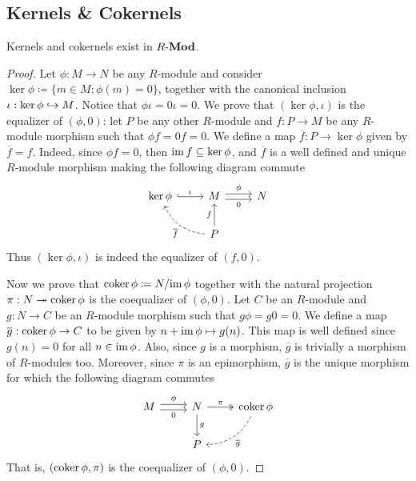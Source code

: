 \subsection{Kernels \& Cokernels}

\begin{lemma}
\label{lem:ker-coker-exist-in-R-mod}
Kernels and cokernels exist in \({R\text{-}\textbf{Mod}}\).
\end{lemma}

\begin{proof}
Let \(\phi: M \to N\) be any \(R\)-module and consider
\(\ker \phi \coloneq \{m \in M \colon \phi(m) = 0\}\), together with the
canonical inclusion \(\iota: \ker \phi \hookrightarrow M\). Notice that
\(\phi \iota = 0 \iota = 0\). We prove that \((\ker \phi, \iota)\) is the
equalizer of \((\phi, 0)\): let \(P\) be any other \(R\)-module and
\(f: P \to M\) be any \(R\)-module morphism such that \(\phi f = 0 f = 0\). We
define a map \(\overline{f}: P \to \ker \phi\) given by \(\overline{f} = f\).
Indeed, since \(\phi f = 0\), then \(\operatorname{im} f \subseteq \ker \phi\), and
\(\overline{f}\) is a well defined and unique \(R\)-module morphism making the
following diagram commute
\[
\begin{tikzcd}
\ker \phi \ar[r, hook, "\iota"]
&M \ar[r, shift left, "\phi"] \ar[r, shift right, "0"']
&N \\
&P \ar[u, "f"] \ar[ul, dashed, bend left, "\overline{f}"] &
\end{tikzcd}
\]
Thus \((\ker \phi, \iota)\) is indeed the equalizer of \((f, 0)\).

Now we prove that \(\operatorname{coker} \phi \coloneq N/{\operatorname{im} \phi}\) together with the
natural projection \(\pi: N \twoheadrightarrow \operatorname{coker} \phi\) is the coequalizer of
\((\phi, 0)\). Let \(C\) be an \(R\)-module and \(g: N \to C\) be an
\(R\)-module morphism such that \(g \phi = g 0 = 0\). We define a map
\(\overline{g}: \operatorname{coker} \phi \to C\) to be given by \(n + \operatorname{im} \phi \mapsto
g(n)\). This map is well defined since \(g(n) = 0\) for all \(n \in \operatorname{im}
\phi\). Also, since \(g\) is a morphism, \(\overline{g}\) is trivially a
morphism of \(R\)-modules too. Moreover, since \(\pi\) is an epimorphism,
\(\overline{g}\) is the unique morphism for which the following diagram commutes
\[
\begin{tikzcd}
M \ar[r, shift left, "\phi"] \ar[r, shift right, "0"']
& N \ar[r, two heads, "\pi"] \ar[d, "g"]
&\coker \phi \ar[dl, bend left, dashed, "\overline{g}"]
\\
&P &
\end{tikzcd}
\]
That is, \((\operatorname{coker} \phi, \pi)\) is the coequalizer of \((\phi, 0)\).
\end{proof}

